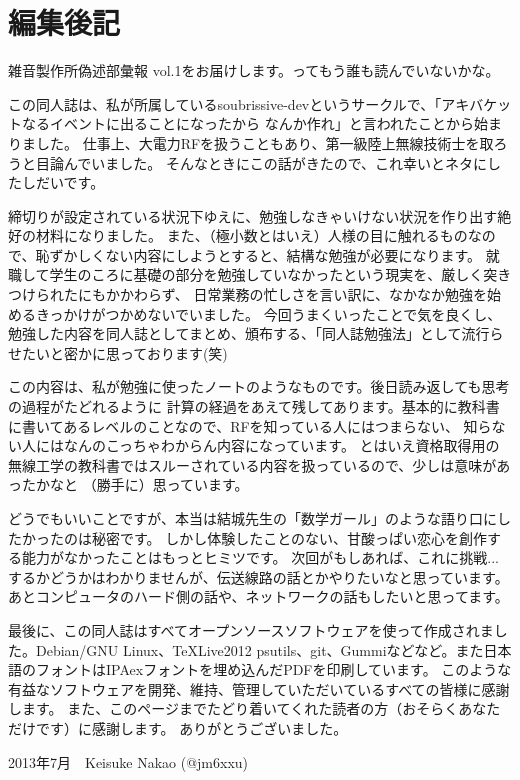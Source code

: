 \chapter*{編集後記}
雑音製作所偽述部彙報 vol.1をお届けします。ってもう誰も読んでいないかな。

この同人誌は、私が所属しているsoubrissive-devというサークルで、「アキバケットなるイベントに出ることになったから
なんか作れ」と言われたことから始まりました。
仕事上、大電力RFを扱うこともあり、第一級陸上無線技術士を取ろうと目論んでいました。
そんなときにこの話がきたので、これ幸いとネタにしたしだいです。

締切りが設定されている状況下ゆえに、勉強しなきゃいけない状況を作り出す絶好の材料になりました。
また、（極小数とはいえ）人様の目に触れるものなので、恥ずかしくない内容にしようとすると、結構な勉強が必要になります。
就職して学生のころに基礎の部分を勉強していなかったという現実を、厳しく突きつけられたにもかかわらず、
日常業務の忙しさを言い訳に、なかなか勉強を始めるきっかけがつかめないでいました。
今回うまくいったことで気を良くし、勉強した内容を同人誌としてまとめ、頒布する、「同人誌勉強法」として流行らせたいと密かに思っております(笑)

この内容は、私が勉強に使ったノートのようなものです。後日読み返しても思考の過程がたどれるように
計算の経過をあえて残してあります。基本的に教科書に書いてあるレベルのことなので、RFを知っている人にはつまらない、
知らない人にはなんのこっちゃわからん内容になっています。
とはいえ資格取得用の無線工学の教科書ではスルーされている内容を扱っているので、少しは意味があったかなと
（勝手に）思っています。

どうでもいいことですが、本当は結城先生の「数学ガール」のような語り口にしたかったのは秘密です。
しかし体験したことのない、甘酸っぱい恋心を創作する能力がなかったことはもっとヒミツです。
次回がもしあれば、これに挑戦...するかどうかはわかりませんが、伝送線路の話とかやりたいなと思っています。
あとコンピュータのハード側の話や、ネットワークの話もしたいと思ってます。

最後に、この同人誌はすべてオープンソースソフトウェアを使って作成されました。Debian/GNU Linux、\TeX Live2012
psutils、git、Gummiなどなど。また日本語のフォントはIPAexフォントを埋め込んだPDFを印刷しています。
このような有益なソフトウェアを開発、維持、管理していただいているすべての皆様に感謝します。
また、このページまでたどり着いてくれた読者の方（おそらくあなただけです）に感謝します。
ありがとうございました。

\begin{flushright}
2013年7月　Keisuke Nakao (@jm6xxu) 
\end{flushright}

